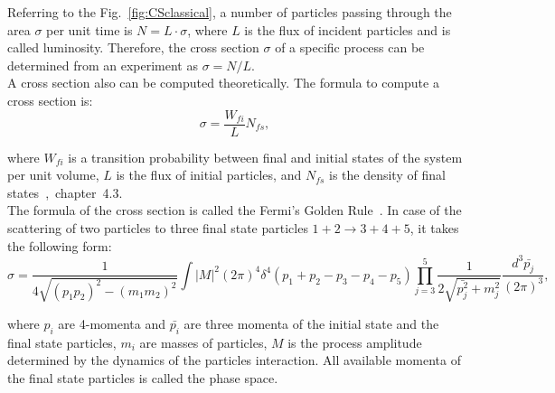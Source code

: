 Referring to the Fig.~\ref{fig:CSclassical}, a number of particles passing through the area $\sigma$ per unit time is $N=L \cdot \sigma$, where $L$ is the flux of incident particles and is called luminosity. Therefore, the cross section $\sigma$ of a specific process can be determined from an experiment as $\sigma=N/L$. \\

A cross section also can be computed theoretically. The formula to compute a cross section is:\\

\begin{equation}
  \sigma = \frac{W_{fi}}{L} N_{fs},
\end{equation}

where $W_{fi}$ is a transition probability between final and initial states of the system per unit volume, $L$ is the flux of initial particles, and $N_{fs}$ is the density of final states~\cite{ref_Halzen_Martin},~chapter~4.3.\\ 

The formula of the cross section is called the Fermi's Golden Rule~\cite{ref_Griffiths}. In case of the scattering of two particles to three final state particles $1+2\rightarrow 3+4+5$, it takes the following form:\\

\begin{equation}\label{eq:FermiGoldenRule}
  \sigma = \frac{ 1 }{4\sqrt{(p_1p_2)^2-(m_1m_2)^2}} \int |M|^2 (2\pi)^4 \delta^4(p_1+p_2-p_3-p_4-p_5) \prod_{j=3}^{5} \frac{1}{2 \sqrt{\bar{p_j^2}+m_j^2 }}\frac{d^3\bar{p_j}}{(2\pi)^3},  
\end{equation}

where $p_i$ are 4-momenta and ${\bar{p_i}}$ are three momenta of the initial state and the final state particles, $m_i$ are masses of particles, $M$ is the process amplitude determined by the dynamics of the particles interaction. All available momenta of the final state particles is called the phase space.\\ 

